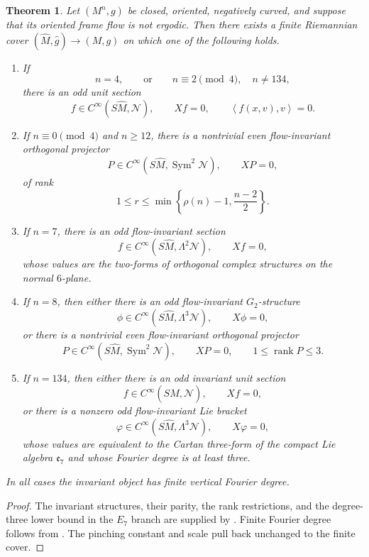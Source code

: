 \documentclass[reqno,11pt]{amsart}
\newtheorem{theorem}{Theorem}[section]
\theoremstyle{definition}
\newcommand{\cN}{\mathcal N}
\newcommand{\Sym}{\operatorname{Sym}}
\newcommand{\inner}[2]{\left\langle #1,#2\right\rangle}
\begin{document}
\begin{theorem}
\label{thm:CLMS-input}
Let $(M^n,g)$ be closed, oriented, negatively curved, and suppose that its
oriented frame flow is not ergodic. Then there exists a finite Riemannian
cover $(\widehat M,\widehat g)\to(M,g)$ on which one of the following holds.
\begin{enumerate}[label=\textup{(\roman*)}]
\item If
$$
 n=4,
 \qquad\text{or}\qquad
 n\equiv2\pmod4,\quad n\neq134,
$$
there is an odd unit section
$$
  f\in C^\infty(S\widehat M,\cN),
  \qquad Xf=0,
  \qquad \inner{f(x,v)}v=0.
$$
\item If $n\equiv0\pmod4$ and $n\geq12$, there is a nontrivial even
flow-invariant orthogonal projector
$$
  P\in C^\infty(S\widehat M,\Sym^2\cN),
  \qquad XP=0,
$$
of rank
$$
  1\leq r\leq
  \min\left\{\rho(n)-1,\frac{n-2}{2}\right\}.
$$
\item If $n=7$, there is an odd flow-invariant section
$$
  f\in C^\infty(S\widehat M,\Lambda^2\cN),
  \qquad Xf=0,
$$
whose values are the two-forms of orthogonal complex structures on the
normal $6$-plane.
\item If $n=8$, then either there is an odd flow-invariant $G_2$-structure
$$
  \phi\in C^\infty(S\widehat M,\Lambda^3\cN),
  \qquad X\phi=0,
$$
or there is a nontrivial even flow-invariant orthogonal projector
$$
  P\in C^\infty(S\widehat M,\Sym^2\cN),
  \qquad XP=0,
  \qquad 1\leq\operatorname{rank}P\leq3.
$$
\item If $n=134$, then either there is an odd invariant unit section
$$
  f\in C^\infty(S\widehat M,\cN),
  \qquad Xf=0,
$$
or there is a nonzero odd flow-invariant Lie bracket
$$
  \varphi\in C^\infty(S\widehat M,\Lambda^3\cN),
  \qquad X\varphi=0,
$$
whose values are equivalent to the Cartan three-form of the compact Lie
algebra $\mathfrak e_7$ and whose Fourier degree is at least three.
\end{enumerate}
In all cases the invariant object has finite vertical Fourier degree.
\end{theorem}

\begin{proof}
The invariant structures, their parity, the rank restrictions, and the
degree-three lower bound in the $E_7$ branch are supplied by
\cite[Theorem~3.8 and Lemmas~3.12--3.13]{CLMS24}.  Finite Fourier degree
follows from \cite[Theorem~4.1]{GPSU16}.  The pinching constant and scale
pull back unchanged to the finite cover.
\end{proof}
\end{document}
